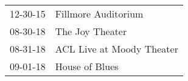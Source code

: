 \begin{supertabular}{p{0.25\columnwidth}p{0.75\columnwidth}}
 12-30-15 &        Fillmore Auditorium \\
 08-30-18 &           The Joy  Theater \\
 08-31-18 &  ACL Live at Moody Theater \\
 09-01-18 &             House of Blues \\
\end{supertabular}
